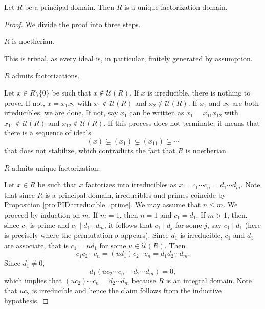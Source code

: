 \begin{theorem}
\label{thm:PID=>UFD}
	Let $R$ be a principal domain. 
	Then $R$ is a unique factorization domain.
\end{theorem}

\begin{proof}
	We divide the proof into three steps. 
	\begin{claim}
		$R$ is noetherian. 	
	\end{claim}
	
	This is trivial, as every ideal is, in particular, finitely generated by assumption.   

	\begin{claim}
		$R$ admits factorizations. 	
	\end{claim}
	
	Let $x\in R\setminus\{0\}$ be such that $x\not\in\mathcal{U}(R)$. If $x$ is irreducible, 
	there is nothing to prove. If not, $x=x_1x_2$ with $x_1\not\in\mathcal{U}(R)$ and
	$x_2\not\in\mathcal{U}(R)$. If $x_1$ and $x_2$ are both irreducibles, 
	we are done. If not, say $x_1$ can be written as $x_1=x_{11}x_{12}$ with
	$x_{11}\not\in\mathcal{U}(R)$ and $x_{12}\not\in\mathcal{U}(R)$. If this process
	does not terminate, it means that there is a sequence of ideals
	\[
	(x)\subsetneq (x_1)\subsetneq (x_{11})\subsetneq\cdots 
	\]
	that does not stabilize, which contradicts the fact that $R$ is noetherian.  
	
	\begin{claim}
		$R$ admits unique factorization.	
	\end{claim}
	
	Let $x\in R$ be such that $x$ factorizes into irreducibles as 
	$x=c_1\cdots c_n=d_1\cdots d_m$. 
	Note that since $R$ is a principal domain, irreducibles and primes coincide by 
	Proposition \ref{pro:PID:irreducible=prime}. 
	We may assume that $n\leq m$. We proceed by 
	induction on $m$. If $m=1$, then 
	$n=1$ and $c_1=d_1$. If $m>1$, then, since $c_1$ is prime and 
	$c_1\mid d_1\cdots d_m$, it follows that $c_1\mid d_j$ for some $j$, 
	say $c_1\mid d_1$ (here is precisely where the permutation $\sigma$ appears). Since
	$d_1$ is irreducible, $c_1$ and $d_1$ are associate, that is
	$c_1=ud_1$ for some $u\in\mathcal{U}(R)$. Then
	\[
	c_1c_2\cdots c_n=(ud_1)c_2\cdots c_n=d_1d_2\cdots d_m. 
	\]
	Since $d_1\ne 0$,  
	\[
	d_1(uc_2\cdots c_n-d_2\cdots d_m)=0,
	\]
	which implies that $(uc_2)\cdots c_n=d_2\cdots d_m$ because $R$ is an integral domain. Note
	that $uc_2$ is irreducible and hence 
	the claim follows from the inductive hypothesis. 
\end{proof}

